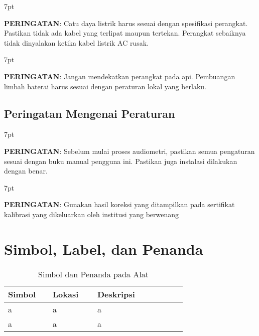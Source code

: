 \documentclass[11pt,a4paper,twoside,draft,onecolumn]{book}
\newenvironment{formalred}{%
	\def\FrameCommand{%
		\hspace{1pt}%
		{\color{red}\vrule width 2pt}%
		{\color{formalshade}\vrule width 4pt}%
		\colorbox{formalshade}%
	}%
	\MakeFramed{\advance\hsize-\width\FrameRestore}%
	\noindent\hspace{-4.55pt}%
	\begin{adjustwidth}{}{7pt}%
		\vspace{2pt}\vspace{2pt}%
	}
	{%
		\vspace{2pt}\end{adjustwidth}\endMakeFramed%
}
\begin{document}
				\begin{formalred}
					\raisebox{0.125ex}{\resizebox{!}{2ex}{\danger}} \textbf{PERINGATAN}: 
					Catu daya listrik harus sesuai dengan spesifikasi perangkat. Pastikan tidak ada kabel yang terlipat maupun tertekan. Perangkat sebaiknya tidak dinyalakan ketika kabel listrik AC rusak. 
				\end{formalred}
				
				\begin{formalred}
					\raisebox{0.125ex}{\resizebox{!}{2ex}{\danger}} \textbf{PERINGATAN}: 
					Jangan mendekatkan perangkat pada api. Pembuangan limbah baterai harus sesuai dengan peraturan lokal yang berlaku.
				\end{formalred}
			
			\subsection{Peringatan Mengenai Peraturan}
				\begin{formalred}
					\raisebox{0.125ex}{\resizebox{!}{2ex}{\danger}} \textbf{PERINGATAN}: 
					Sebelum mulai proses audiometri, pastikan semua pengaturan sesuai dengan buku manual pengguna ini. Pastikan juga instalasi dilakukan dengan benar.
				\end{formalred}
				
				\begin{formalred}
					\raisebox{0.125ex}{\resizebox{!}{2ex}{\danger}} \textbf{PERINGATAN}: 
					Gunakan hasil koreksi yang ditampilkan pada sertifikat kalibrasi yang dikeluarkan oleh institusi yang berwenang
				\end{formalred}	
			
		\section{Simbol, Label, dan Penanda}
		\begin{table}
			\centering
			\caption{Simbol dan Penanda pada Alat}
			\label{tab:2.2}
			\begin{tabular}{|p{0.2\linewidth}  | p{0.2\linewidth}| p{0.4\linewidth}|}
				\hline
				Simbol & Lokasi & Deskripsi\\
				\hline
				\hline
				a & a & a\\
				\hline
				a & a & a\\
				\hline
			\end{tabular}
		\end{table}
		
	\newpage
	
\end{document}
